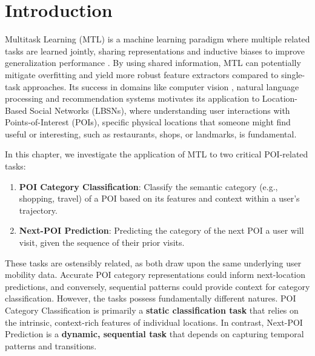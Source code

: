 \section{Introduction}
\label{sec:cbic:intro}

Multitask Learning (MTL) is a machine learning paradigm where multiple related tasks are learned jointly, sharing representations and inductive biases to improve generalization performance \cite{caruana1997multitask}. By using shared information, MTL can potentially mitigate overfitting and yield more robust feature extractors compared to single-task approaches. Its success in domains like computer vision \cite{kokkinos2016ubernet}, natural language processing \cite{wei2022finetuned} and recommendation systems \cite{Zhang2020} motivates its application to Location-Based Social Networks (LBSNs), where understanding user interactions with Points-of-Interest (POIs), specific physical locations that someone might find useful or interesting, such as restaurants, shops, or landmarks, is fundamental.

In this chapter, we investigate the application of MTL to two critical POI-related tasks:
\begin{enumerate}
    \item \textbf{POI Category Classification}: Classify the semantic category (e.g., shopping, travel) of a POI based on its features and context within a user's trajectory.
    \item \textbf{Next-POI Prediction}: Predicting the category of the next POI a user will visit, given the sequence of their prior visits.
\end{enumerate}

These tasks are ostensibly related, as both draw upon the same underlying user mobility data. Accurate POI category representations could inform next-location predictions, and conversely, sequential patterns could provide context for category classification. However, the tasks possess fundamentally different natures. POI Category Classification is primarily a \textbf{static classification task} that relies on the intrinsic, context-rich features of individual locations. In contrast, Next-POI Prediction is a \textbf{dynamic, sequential task} that depends on capturing temporal patterns and transitions.

